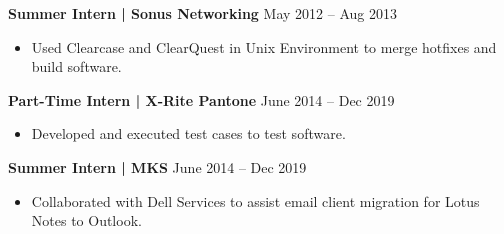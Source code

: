 \documentclass[letterpaper, 10pt]{article}
\begin{document}
\textbf{Summer Intern | Sonus Networking} \hfill May 2012 – Aug 2013
\begin{itemize}
    \item Used Clearcase and ClearQuest in Unix Environment to merge hotfixes and build software.
\end{itemize}

\textbf{Part-Time Intern | X-Rite Pantone} \hfill June 2014 – Dec 2019
\begin{itemize}
    \item Developed and executed test cases to test software.
\end{itemize}

\textbf{Summer Intern | MKS} \hfill June 2014 – Dec 2019
\begin{itemize}
    \item Collaborated with Dell Services to assist email client migration for Lotus Notes to Outlook.
\end{itemize}
\end{document}
